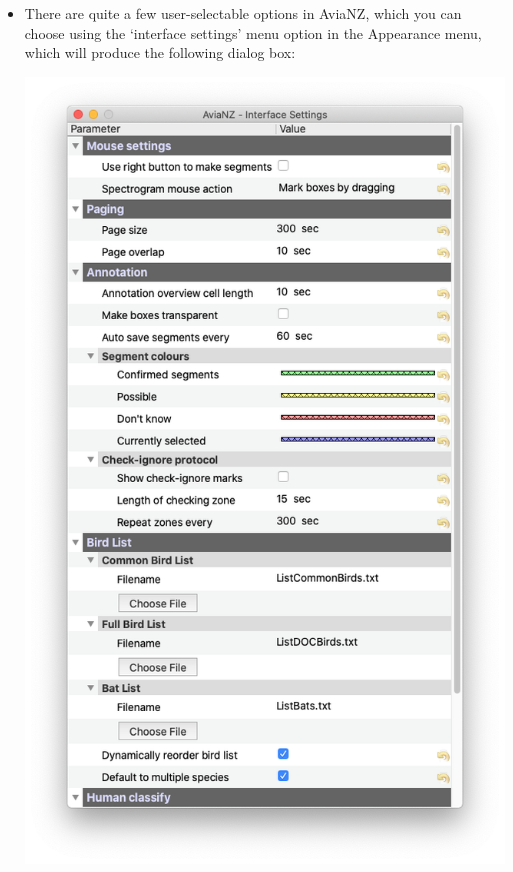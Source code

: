 \documentclass{article}
\begin{document}
\begin{itemize}
\item There are quite a few user-selectable options in AviaNZ, which you can choose using the `interface settings' menu option in the Appearance menu, which will produce the following dialog box:
\begin{center}
    \includegraphics[width=.4\textwidth]{Figures/InterfaceSettings}
\end{center}


\end{itemize}
\end{document}
